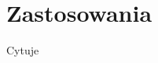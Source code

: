 \chapter{Zastosowania}
Cytuje\cite{ICaWoETiTAPise2010PhysiologicalmonitoringsystemformobilehealthcareapplicationsAppliedcomputingLifeandmedicalsciences}

\label{cha:zastosowania}

